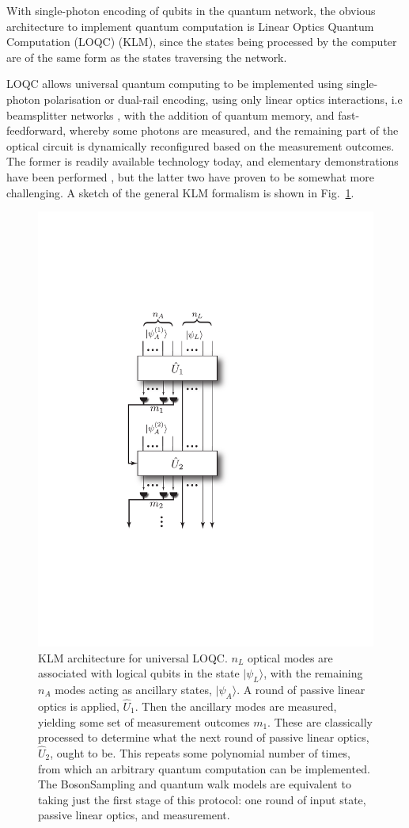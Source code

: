 \documentclass[aps,rmp,twocolumn,amsmath,amssymb,nofootinbib,superscriptaddress]{revtex4}
\newcommand{\ket}[1]{|#1\rangle}
\begin{document}
With single-photon encoding of qubits in the quantum network, the obvious architecture to implement quantum computation is Linear Optics Quantum Computation (LOQC) \cite{bib:KLM01, bib:KokLovettBook} (KLM), since the states being processed by the computer are of the same form as the states traversing the network.

LOQC allows universal quantum computing to be implemented using single-photon polarisation or dual-rail encoding, using only linear optics interactions, i.e beamsplitter networks \cite{bib:Reck94}, with the addition of quantum memory, and fast-feedforward, whereby some photons are measured, and the remaining part of the optical circuit is dynamically reconfigured based on the measurement outcomes. The former is readily available technology today, and elementary demonstrations have been performed \cite{???, bib:OBrien03}, but the latter two have proven to be somewhat more challenging. A sketch of the general KLM formalism is shown in Fig.~\ref{fig:KLM_protocol}.

\begin{figure}[!htb]
\includegraphics[width=0.5\columnwidth]{KLM}
\caption{KLM architecture for universal LOQC. $n_L$ optical modes are associated with logical qubits in the state $\ket{\psi_L}$, with the remaining $n_A$ modes acting as ancillary states, $\ket{\psi_A}$. A round of passive linear optics is applied, $\hat{U}_1$. Then the ancillary modes are measured, yielding some set of measurement outcomes $m_1$. These are classically processed to determine what the next round of passive linear optics, $\hat{U}_2$, ought to be. This repeats some polynomial number of times, from which an arbitrary quantum computation can be implemented. The {\sc BosonSampling} and quantum walk models are equivalent to taking just the first stage of this protocol: one round of input state, passive linear optics, and measurement.} \label{fig:KLM_protocol}
\end{figure}
\end{document}
